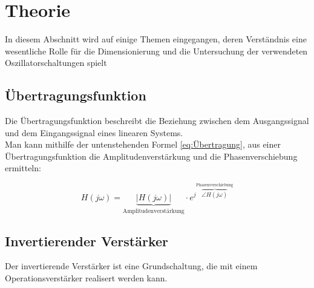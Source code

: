 



\section{Theorie}

In diesem Abschnitt wird auf einige Themen eingegangen, deren Verständnis eine wesentliche Rolle für die Dimensionierung und die Untersuchung der verwendeten Oszillatorschaltungen spielt

\subsection{Übertragungsfunktion}
%
Die Übertragungsfunktion beschreibt die Beziehung zwischen dem Ausgangssignal und dem Eingangssignal eines linearen Systems.\\
%
Man kann mithilfe der untenstehenden Formel \ref{eq:Übertragung}, aus einer Übertragungsfunktion die Amplitudenverstärkung und die Phasenverschiebung ermitteln:

\begin{equation}
\label{eq:Übertragung}
H(j\omega) = \underbrace{|H(j\omega)|}_{\text{Amplitudenverstärkung}} \cdot e^{j \overbrace{\angle H(j\omega)}^{\text{Phasenverschiebung}}}
\end{equation}


\subsection{Invertierender Verstärker}
%
Der invertierende Verstärker ist eine Grundschaltung, die mit einem Operationsverstärker realisert werden kann. 


